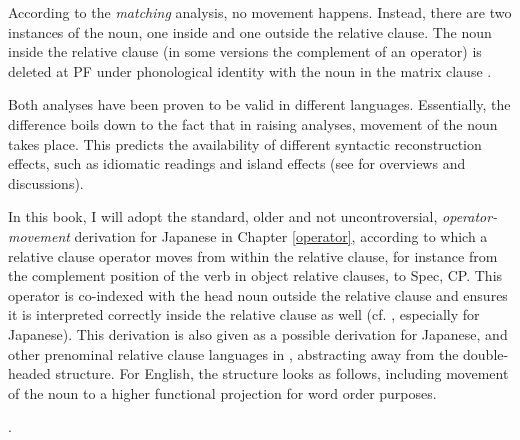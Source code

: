 \documentclass [output=book,colorlinks,citecolor=brown]{langscibook}
\begin{document}
According to the \textit{matching} analysis, no movement happens. Instead, there are two instances of the noun, one inside and one outside the relative clause. The noun inside the relative clause (in some versions the complement of an operator) is deleted at PF under phonological identity with the noun in the matrix clause \citep{lees:1961:constituent, chomsky:1965:aspects, schachter:1973:focus, sauerland:1998:the, sauerland:2003:a, salzmann:2017:reconstruction, salzmann:2019:new}.

Both analyses have been proven to be valid in different languages. Essentially, the difference boils down to the fact that in raising analyses, movement of the noun takes place. This predicts the availability of different syntactic reconstruction effects, such as idiomatic readings and island effects (see \citealt{cinque:2008:more, cinque:2020:relcl, salzmann:2017:reconstruction, salzmann:2019:new} for overviews and discussions). %

In this book, I will adopt the standard, older and not uncontroversial, \textit{operator-movement} derivation for Japanese in Chapter \ref{operator}, according to which a relative clause operator moves from within the relative clause, for instance from the complement position of the verb in object relative clauses, to Spec, CP. This operator is co-indexed with the head noun outside the relative clause and ensures it is interpreted correctly inside the relative clause as well (cf. \citealt{chomsky:1977:on}, especially \citealt{miyamoto:2017:RC} for Japanese). This derivation is also given as a possible derivation for Japanese, and other prenominal relative clause languages in \citet[81]{cinque:2020:relcl}, abstracting away from the double-headed structure. For English, the structure looks as follows, including movement of the noun to a higher functional projection for word order purposes. %

\newpage

\ex. 
\end{document}
